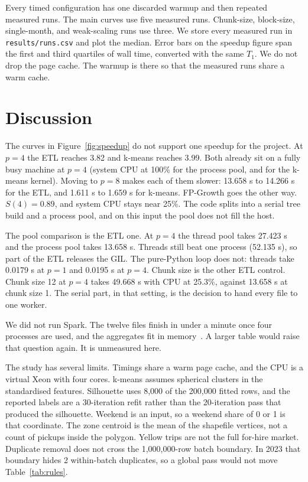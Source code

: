 \documentclass[11pt,a4paper]{article}
\begin{document}
Every timed configuration has one discarded warmup and then repeated measured runs. The main curves use five measured runs. Chunk-size, block-size, single-month, and weak-scaling runs use three. We store every measured run in \texttt{results/runs.csv} and plot the median. Error bars on the speedup figure span the first and third quartiles of wall time, converted with the same $T_1$. We do not drop the page cache. The warmup is there so that the measured runs share a warm cache.



\FloatBarrier
\section{Discussion}
\label{sec:discuss}

The curves in Figure~\ref{fig:speedup} do not support one speedup for the project. At $p = 4$ the ETL reaches 3.82 and k-means reaches 3.99. Both already sit on a fully busy machine at $p = 4$ (system CPU at 100\% for the process pool, and for the k-means kernel). Moving to $p = 8$ makes each of them slower: 13.658 s to 14.266 s for the ETL, and 1.611 s to 1.659 s for k-means. FP-Growth goes the other way. $S(4) = 0.89$, and system CPU stays near 25\%. The code splits into a serial tree build and a process pool, and on this input the pool does not fill the host.

The pool comparison is the ETL one. At $p = 4$ the thread pool takes 27.423 s and the process pool takes 13.658 s. Threads still beat one process (52.135 s), so part of the ETL releases the GIL. The pure-Python loop does not: threads take 0.0179 s at $p = 1$ and 0.0195 s at $p = 4$. Chunk size is the other ETL control. Chunk size 12 at $p = 4$ takes 49.668 s with CPU at 25.3\%, against 13.658 s at chunk size 1. The serial part, in that setting, is the decision to hand every file to one worker.

We did not run Spark. The twelve files finish in under a minute once four processes are used, and the aggregates fit in memory~\cite{zaharia2012}. A larger table would raise that question again. It is unmeasured here.

The study has several limits. Timings share a warm page cache, and the CPU is a virtual Xeon with four cores. k-means assumes spherical clusters in the standardised features. Silhouette uses 8{,}000 of the 200{,}000 fitted rows, and the reported labels are a 30-iteration refit rather than the 20-iteration pass that produced the silhouette. Weekend is an input, so a weekend share of 0 or 1 is that coordinate. The zone centroid is the mean of the shapefile vertices, not a count of pickups inside the polygon. Yellow trips are not the full for-hire market. Duplicate removal does not cross the 1{,}000{,}000-row batch boundary. In 2023 that boundary hides 2 within-batch duplicates, so a global pass would not move Table~\ref{tab:rules}.
\end{document}
